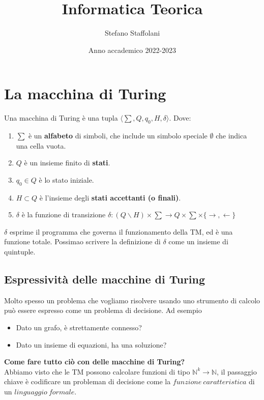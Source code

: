 \documentclass[a4paper, 12pt]{article}
\title{Informatica Teorica}
\author{Stefano Staffolani}
\date{ Anno accademico 2022-2023}
\begin{document}
\maketitle
\tableofcontents
\newpage
\section{La macchina di Turing}
Una macchina di Turing \`e una tupla $\langle \sum, Q,q_0,H,\delta\rangle$. Dove: 
\begin{enumerate}
\item $\sum$ \`e un \textbf{alfabeto} di simboli, che include un simbolo speciale $\emptyset$ che indica una cella vuota.
\item $Q$ \`e un insieme finito di \textbf{stati}.
\item $q_0 \in Q$ \`e lo stato iniziale.
\item $H \subset Q$ \`e l'insieme degli \textbf{stati accettanti (o finali)}.
\item $\delta$ \`e la funzione di transizione $\delta: (Q \backslash H) \times \sum \rightarrow Q \times \sum \times \{ \rightarrow, \leftarrow \} $
\end{enumerate}
$\delta$ esprime il programma che governa il funzionamento della TM, ed \`e una funzione totale. Possimao scrivere la definizione di $\delta$ come un insieme di quintuple.
\subsection{Espressivit\`a delle macchine di Turing}
Molto spesso un problema che vogliamo risolvere usando uno strumento di calcolo pu\`o essere espresso come un problema di decisione. Ad esempio\begin{itemize}
\item Dato un grafo, \`e strettamente connesso?
\item Dato un insieme di equazioni, ha una soluzione?
\end{itemize}
\textbf{Come fare tutto ci\`o con delle macchine di Turing?}\\
Abbiamo visto che le TM possono calcolare funzioni di tipo $\mathbb{N}^{k} \rightarrow \mathbb{N}$, il passaggio chiave \`e codificare un probleman di decisione come la $funzione\ caratteristica$ di un $linguaggio\ formale$.
\end{document}
